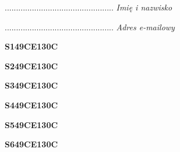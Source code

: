 \begin{turn}{90}\begin{minipage}{\linewidth} \vspace{20mm} ................................................  \textit{Imię i nazwisko}\end{minipage}\end{turn}

\begin{turn}{90}\begin{minipage}{\linewidth} \vspace{20mm} ................................................  \textit{Adres e-mailowy}\end{minipage}\end{turn}

\begin{turn}{90}\huge \begin{minipage}{\linewidth} \vspace{10mm}\textbf{S149CE130C}\end{minipage}\end{turn}

\begin{turn}{90}\huge \begin{minipage}{\linewidth} \vspace{10mm}\textbf{S249CE130C}\end{minipage}\end{turn}

\begin{turn}{90}\huge \begin{minipage}{\linewidth} \vspace{10mm}\textbf{S349CE130C}\end{minipage}\end{turn}

\begin{turn}{90}\huge \begin{minipage}{\linewidth} \vspace{10mm}\textbf{S449CE130C}\end{minipage}\end{turn}

\begin{turn}{90}\huge \begin{minipage}{\linewidth} \vspace{10mm}\textbf{S549CE130C}\end{minipage}\end{turn}

\begin{turn}{90}\huge \begin{minipage}{\linewidth} \vspace{10mm}\textbf{S649CE130C}\end{minipage}\end{turn}

